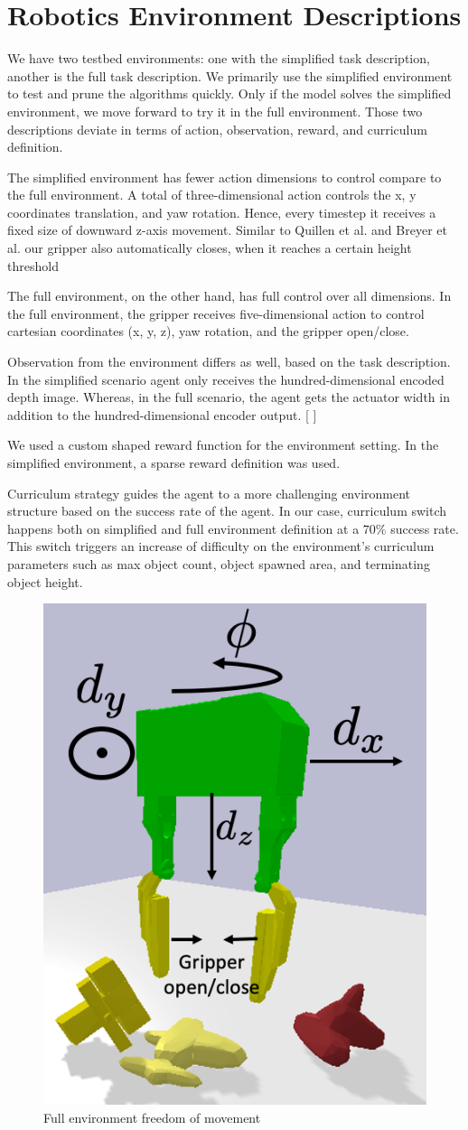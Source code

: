 \section{Robotics Environment Descriptions}

We have two testbed environments: one with the simplified task description, another is the full task description. We primarily use the simplified environment to test and prune the algorithms quickly. Only if the model solves the simplified environment, we move forward to try it in the full environment. Those two descriptions deviate in terms of action, observation, reward, and curriculum definition. 

The simplified environment has fewer action dimensions to control compare to the full environment. A total of three-dimensional action controls the x, y coordinates translation, and yaw rotation. Hence, every timestep it receives a fixed size of downward z-axis movement. Similar to Quillen et al. and Breyer et al. our gripper also automatically closes, when it reaches a certain height threshold

The full environment, on the other hand, has full control over all dimensions. In the full environment, the gripper receives five-dimensional action to control cartesian coordinates (x, y, z), yaw rotation, and the gripper open/close. 

Observation from the environment differs as well, based on the task description. In the simplified scenario agent only receives the hundred-dimensional encoded depth image. Whereas, in the full scenario, the agent gets the actuator width in addition to the hundred-dimensional encoder output. [ ]

We used a custom shaped reward function for the environment setting. In the simplified environment, a sparse reward definition was used. 

Curriculum strategy guides the agent to a more challenging environment structure based on the success rate of the agent. In our case, curriculum switch happens both on simplified and full environment definition at a \(70\%\) success rate. This switch triggers an increase of difficulty on the environment’s curriculum parameters such as max object count, object spawned area, and terminating object height.


\begin{figure}[htbp]
    \centering
    \includegraphics[width=0.3\linewidth]{figures/freedomDim.png}
\caption{Full environment freedom of movement} \label{fig:breyer}

\end{figure}


